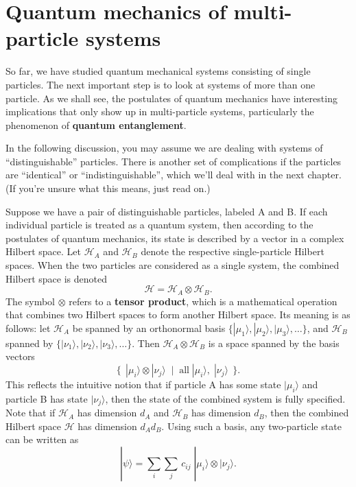 \documentclass[pra,12pt]{revtex4}
\begin{document}
\section{Quantum mechanics of multi-particle systems}

So far, we have studied quantum mechanical systems consisting of
single particles.  The next important step is to look at systems of
more than one particle.  As we shall see, the postulates of quantum
mechanics have interesting implications that only show up in
multi-particle systems, particularly the phenomenon of \textbf{quantum
  entanglement}.

In the following discussion, you may assume we are dealing with
systems of ``distinguishable'' particles.  There is another set of
complications if the particles are ``identical'' or
``indistinguishable'', which we'll deal with in the next chapter.  (If
you're unsure what this means, just read on.)

Suppose we have a pair of distinguishable particles, labeled A and B.
If each individual particle is treated as a quantum system, then
according to the postulates of quantum mechanics, its state is
described by a vector in a complex Hilbert space.  Let $\mathscr{H}_A$
and $\mathscr{H}_B$ denote the respective single-particle Hilbert
spaces.  When the two particles are considered as a single system, the
combined Hilbert space is denoted
$$\mathscr{H} = \mathscr{H}_A\otimes \mathscr{H}_B.$$
The symbol $\otimes$ refers to a \textbf{tensor product}, which is a
mathematical operation that combines two Hilbert spaces to form
another Hilbert space.  Its meaning is as follows: let $\mathscr{H}_A$
be spanned by an orthonormal basis $\{|\mu_1\rangle, |\mu_2\rangle,
|\mu_3\rangle, \dots\}$, and $\mathscr{H}_B$ spanned by
$\{|\nu_1\rangle, |\nu_2\rangle, |\nu_3\rangle, \dots\}$.  Then
$\mathscr{H}_A \otimes \mathscr{H}_B$ is a space spanned by the basis
vectors
$$\Big\{\;\,|\mu_i\rangle\otimes|\nu_j\rangle \;\;  \Big| \;\; \textrm{all}\;|\mu_i\rangle,\; |\nu_j\rangle \;\,\Big\}.$$
This reflects the intuitive notion that if particle A has some state
$|\mu_i\rangle$ and particle B has state $|\nu_j\rangle$, then the
state of the combined system is fully specified.  Note that if
$\mathscr{H}_A$ has dimension $d_A$ and $\mathscr{H}_B$ has dimension
$d_B$, then the combined Hilbert space $\mathscr{H}$ has dimension
$d_A d_B$.  Using such a basis, any two-particle state can be written as
$$|\psi\rangle = \sum_{i} \sum_{j} \, c_{ij}\; |\mu_i\rangle \otimes |\nu_j\rangle.$$
\end{document}

